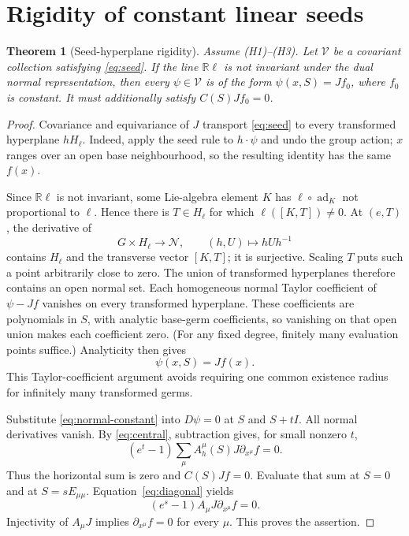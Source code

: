 \documentclass[11pt]{article}
\newtheorem{theorem}{Theorem}[section]
\theoremstyle{definition}\newtheorem{definition}[theorem]{Definition}
\theoremstyle{remark}\newtheorem{remark}[theorem]{Remark}
\newcommand{\R}{\mathbb R}\newcommand{\C}{\mathbb C}
\newcommand{\Ncal}{\mathcal N}\newcommand{\Hobs}{\mathcal H}
\begin{document}
\section{Rigidity of constant linear seeds}\label{sec:rigidity}
\begin{theorem}[Seed-hyperplane rigidity]\label{thm:rigidity}
Assume (H1)--(H3). Let $\mathcal V$ be a covariant collection satisfying \eqref{eq:seed}. If the line $\R\ell$ is not invariant under the dual normal representation, then every $\psi\in\mathcal V$ is of the form $\psi(x,S)=Jf_0$, where $f_0$ is constant. It must additionally satisfy $C(S)Jf_0=0$.
\end{theorem}
\begin{proof}
Covariance and equivariance of $J$ transport \eqref{eq:seed} to every transformed hyperplane $hH_\ell$. Indeed, apply the seed rule to $h\cdot\psi$ and undo the group action; $x$ ranges over an open base neighbourhood, so the resulting identity has the same $f(x)$.

Since $\R\ell$ is not invariant, some Lie-algebra element $K$ has $\ell\circ\operatorname{ad}_K$ not proportional to $\ell$. Hence there is $T\in H_\ell$ for which $\ell([K,T])\ne0$. At $(e,T)$, the derivative of
\[
 G\times H_\ell\longrightarrow\Ncal,\qquad (h,U)\longmapsto hUh^{-1}
\]
contains $H_\ell$ and the transverse vector $[K,T]$; it is surjective. Scaling $T$ puts such a point arbitrarily close to zero. The union of transformed hyperplanes therefore contains an open normal set. Each homogeneous normal Taylor coefficient of $\psi-Jf$ vanishes on every transformed hyperplane. These coefficients are polynomials in $S$, with analytic base-germ coefficients, so vanishing on that open union makes each coefficient zero. (For any fixed degree, finitely many evaluation points suffice.) Analyticity then gives
\begin{equation}\label{eq:normal-constant}
 \psi(x,S)=Jf(x).
\end{equation}
This Taylor-coefficient argument avoids requiring one common existence radius for infinitely many transformed germs.

Substitute \eqref{eq:normal-constant} into $D\psi=0$ at $S$ and $S+tI$. All normal derivatives vanish. By \eqref{eq:central}, subtraction gives, for small nonzero $t$,
\[
 (e^t-1)\sum_\mu A_h^\mu(S)J\partial_{x^\mu}f=0.
\]
Thus the horizontal sum is zero and $C(S)Jf=0$. Evaluate that sum at $S=0$ and at $S=sE_{\mu\mu}$. Equation~\eqref{eq:diagonal} yields
\[
 (e^s-1)A_\mu J\partial_{x^\mu}f=0.
\]
Injectivity of $A_\mu J$ implies $\partial_{x^\mu}f=0$ for every $\mu$. This proves the assertion.
\end{proof}
\end{document}
